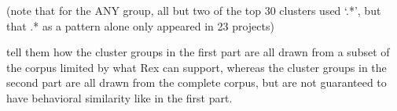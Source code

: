 


(note that for the ANY group, all but two of the top 30 clusters used `.*', but that .* as a pattern alone only appeared in 23 projects)


tell them how the cluster groups in the first part are all drawn from a subset of the corpus limited by what Rex can support, whereas the cluster groups in the second part are all drawn from the complete corpus, but are not guaranteed to have behavioral similarity like in the first part.








